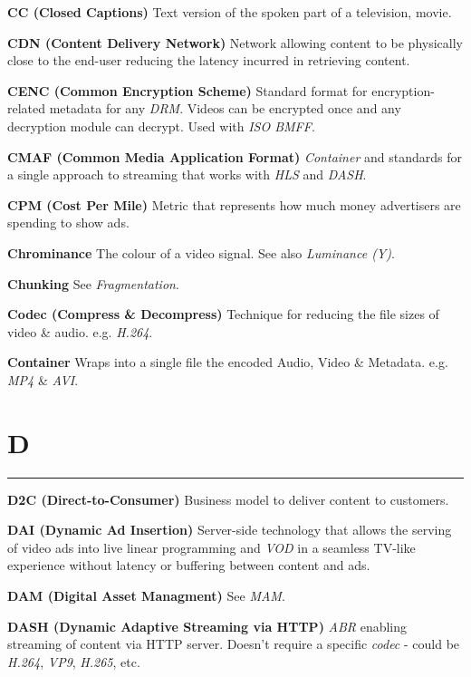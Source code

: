 \smallskip
\textbf{CC (Closed Captions)}
Text version of the spoken part of a television, movie.

\smallskip
\textbf{CDN (Content Delivery Network)}
Network allowing content to be physically close to the end-user reducing the latency incurred in retrieving content.

\smallskip
\textbf{CENC (Common Encryption Scheme)}
Standard format for encryption-related metadata for any \textit{DRM}. Videos can be encrypted once and any decryption module can decrypt.  Used with \textit{ISO BMFF}.

\smallskip
\textbf{CMAF (Common Media Application Format)}
\textit{Container} and standards for a single approach to streaming that works with \textit{HLS} and \textit{DASH}.

\smallskip
\textbf{CPM (Cost Per Mile)}
Metric that represents how much money advertisers are spending to show ads.

\smallskip
\textbf{Chrominance}
The colour of a video signal. See also \textit{Luminance (Y)}.

\smallskip
\textbf{Chunking}
See \textit{Fragmentation}.

\smallskip
\textbf{Codec (Compress \& Decompress)}
Technique for reducing the file sizes of video \& audio. e.g. \textit{H.264}.

\smallskip
\textbf{Container}
Wraps into a single file the encoded Audio, Video \& Metadata.  e.g. \textit{MP4} \& \textit{AVI}.


\section{D}
\hrule

\medskip
\textbf{D2C (Direct-to-Consumer)}
Business model to deliver content to customers.

\smallskip
\textbf{DAI (Dynamic Ad Insertion)}
Server-side technology that allows the serving of video ads into live linear programming and \textit{VOD} in a seamless TV-like experience without latency or buffering between content and ads.

\smallskip
\textbf{DAM (Digital Asset Managment)}
See \textit{MAM}.

\smallskip
\textbf{DASH (Dynamic Adaptive Streaming via HTTP)}
\textit{ABR} enabling streaming of content via HTTP server. Doesn't require a specific \textit{codec} - could be \textit{H.264}, \textit{VP9}, \textit{H.265}, etc.

